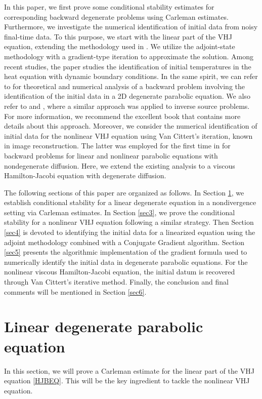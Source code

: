 \documentclass[reqno]{amsart}
\theoremstyle{plain}
\theoremstyle{remark}
\numberwithin{equation}{section}
\begin{document}
In this paper, we first prove some conditional stability estimates for corresponding backward degenerate problems using Carleman estimates. Furthermore, we investigate the numerical identification of initial data from noisy final-time data. To this purpose, we start with the linear part of the VHJ equation, extending the methodology used in \cite{Has17}. We utilize the adjoint-state methodology with a gradient-type iteration to approximate the solution. Among recent studies, the paper \cite{Chorfi23} studies the identification of initial temperatures in the heat equation with dynamic boundary conditions. In the same spirit, we can refer to \cite{Atifi20} for theoretical and numerical analysis of a backward problem involving the identification of the initial data in a 2D degenerate parabolic equation. We also refer to \cite{Hassan2007} and \cite{AIT22}, where a similar approach was applied to inverse source problems. For more information, we recommend the excellent book \cite{Has17} that contains more details about this approach. Moreover, we consider the numerical identification of initial data for the nonlinear VHJ equation using Van Cittert's iteration, known in image reconstruction. The latter was employed for the first time in \cite{Carasso} for backward problems for linear and nonlinear parabolic equations with nondegenerate diffusion. Here, we extend the existing analysis to a viscous Hamilton-Jacobi equation with degenerate diffusion.

The following sections of this paper are organized as follows. In Section \ref{sec2}, we establish conditional stability for a linear degenerate equation in a nondivergence setting via Carleman estimates. In Section \ref{sec3}, we prove the conditional stability for a nonlinear VHJ equation following a similar strategy. Then Section \ref{sec4} is devoted to identifying the initial data for a linearized equation using the adjoint methodology combined with a Conjugate Gradient algorithm. Section \ref{sec5} presents the algorithmic implementation of the gradient formula used to numerically identify the initial data in degenerate parabolic equations. For the nonlinear viscous Hamilton-Jacobi equation, the initial datum is recovered through Van Cittert's iterative method. Finally, the conclusion and final comments will be mentioned in Section \ref{sec6}.
\section{Linear degenerate parabolic equation}\label{sec2}
In this section, we will prove a Carleman estimate for the linear part of the VHJ equation \eqref{HJBEQ}. This will be the key ingredient to tackle the nonlinear VHJ equation.
\end{document}
